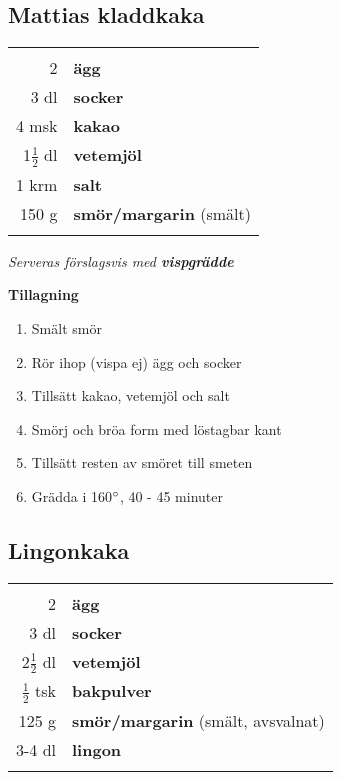 \documentclass[a4paper,12pt]{article}
\newcommand{\tillb}[1]{\noindent \textit{Serveras förslagsvis med \textbf{#1}} \vspace{1cm}}
\begin{document}
\clearpage

\subsection{Mattias kladdkaka}

\begin{table}[H]
	\begin{tabular}{rl}
	\hline
	&\\
		2 & \textbf{ägg}\\
		3 dl & \textbf{socker}\\
		4 msk & \textbf{kakao}\\
		1$\frac{1}{2}$ dl & \textbf{vetemjöl}\\
		1 krm & \textbf{salt}\\
		150 g & \textbf{smör/margarin} (smält)\\
	&\\
	\hline
	\end{tabular}
\end{table}

\tillb{vispgrädde}

\begin{multicols*}{2}

\noindent \textbf{Tillagning}
\begin{enumerate}
	\itemsep0cm
	\item Smält smör
	\item Rör ihop (vispa ej) ägg och \mbox{socker}
	\item Tillsätt kakao, vetemjöl och salt
	\item Smörj och bröa form med löstagbar kant
	\item Tillsätt resten av smöret till smeten
	\item Grädda i 160$\degree$, 40 - 45 minuter
\end{enumerate}

\end{multicols*}

\clearpage

\subsection{Lingonkaka}

\begin{table}[H]
	\begin{tabular}{rl}
	\hline
	&\\
		2 & \textbf{ägg}\\
		3 dl & \textbf{socker}\\
		2$\frac{1}{2}$ dl & \textbf{vetemjöl}\\
		$\frac{1}{2}$ tsk & \textbf{bakpulver}\\
		125 g & \textbf{smör/margarin} (smält, avsvalnat)\\
		3-4 dl & \textbf{lingon}\\
	&\\
	\hline
	\end{tabular}
\end{table}
\end{document}
